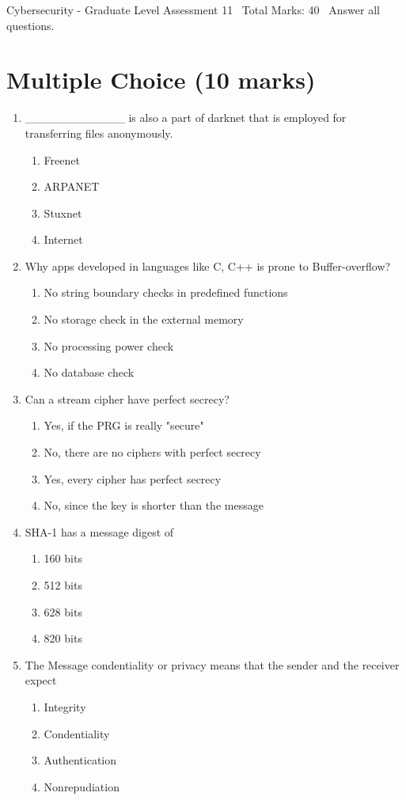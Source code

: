 \documentclass[12pt]{article}
\begin{document}
\begin{center}
Cybersecurity - Graduate Level Assessment 11 \
Total Marks: 40 \
Answer all questions.
\end{center}

\section*{Multiple Choice (10 marks)}
\begin{enumerate}[label=\arabic*.]
\item \_\_\_\_\_\_\_\_\_\_\_\_ is also a part of darknet that is employed for transferring files anonymously.
\begin{enumerate}[label=(\alph*)]
    \item Freenet
    \item ARPANET
    \item Stuxnet
    \item Internet
\end{enumerate}
\item Why apps developed in languages like C, C++ is prone to Buffer-overflow?
\begin{enumerate}[label=(\alph*)]
    \item No string boundary checks in predefined functions
    \item No storage check in the external memory
    \item No processing power check
    \item No database check
\end{enumerate}
\item Can a stream cipher have perfect secrecy?
\begin{enumerate}[label=(\alph*)]
    \item Yes, if the PRG is really "secure"
    \item No, there are no ciphers with perfect secrecy
    \item Yes, every cipher has perfect secrecy
    \item No, since the key is shorter than the message
\end{enumerate}
\item SHA-1 has a message digest of
\begin{enumerate}[label=(\alph*)]
    \item 160 bits
    \item 512 bits
    \item 628 bits
    \item 820 bits
\end{enumerate}
\item The Message condentiality or privacy means that the sender and the receiver expect
\begin{enumerate}[label=(\alph*)]
    \item Integrity
    \item Condentiality
    \item Authentication
    \item Nonrepudiation
\end{enumerate}
\end{enumerate}
\end{document}
